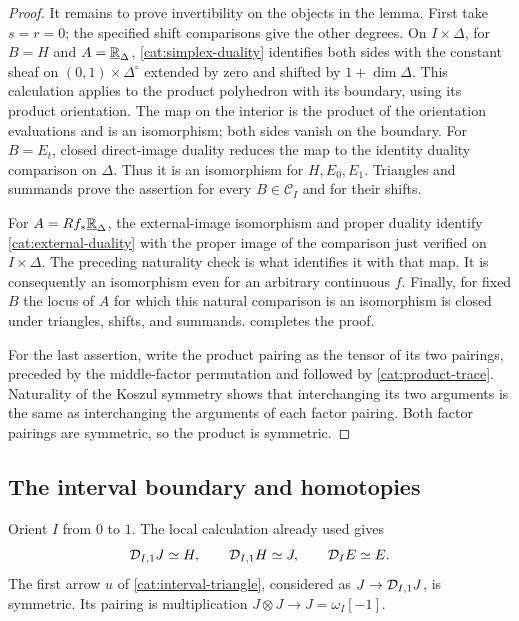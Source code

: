 \begin{proof}
It remains to prove invertibility on the objects in the lemma. First
take $s=r=0$; the specified shift comparisons give the other degrees. On
$I\times\Delta$, for $B=H$ and $A=\underline{\mathbb R}_{\Delta}$,
\eqref{cat:simplex-duality} identifies both sides with the constant
sheaf on $(0,1)\times\Delta^\circ$ extended by zero and shifted by
$1+\dim\Delta$.  This calculation applies to the product polyhedron
with its boundary, using its product orientation.  The map on the
interior is the product of the orientation evaluations and is an
isomorphism; both sides vanish on the boundary.  For $B=E_t$, closed
direct-image duality reduces the map to the identity duality comparison
on $\Delta$.  Thus it is an isomorphism for $H,E_0,E_1$.
Triangles and summands prove the assertion for every
$B\in\mathcal C_I$ and for their shifts.

For $A=Rf_*\underline{\mathbb R}_{\Delta}$, the external-image isomorphism
and proper duality identify \eqref{cat:external-duality} with the
proper image of the comparison just verified on $I\times\Delta$.
The preceding naturality check is what identifies it with that map.
It is consequently an isomorphism even for an arbitrary continuous
$f$.  Finally, for fixed $B$ the locus of $A$ for which this natural
comparison is an isomorphism is closed under triangles, shifts, and
summands.   completes the proof.

For the last assertion, write the product pairing as the tensor of its
two pairings, preceded by the middle-factor permutation and followed
by \eqref{cat:product-trace}.  Naturality of the Koszul symmetry shows
that interchanging its two arguments is the same as interchanging the
arguments of each factor pairing.  Both factor pairings are symmetric,
so the product is symmetric.
\end{proof}

\subsection{The interval boundary and homotopies}

Orient $I$ from $0$ to $1$.  The local calculation already used gives
\begin{equation}
 \label{cat:interval-duals}
 \mathcal D_{I,1}J\simeq H,\qquad
 \mathcal D_{I,1}H\simeq J,\qquad
 \mathcal D_I E\simeq E.
\end{equation}
The first arrow $u$ of \eqref{cat:interval-triangle}, considered as
$J\to\mathcal D_{I,1}J$, is symmetric.  Its pairing is multiplication
$J\otimes J\to J=\omega_I[-1]$.

